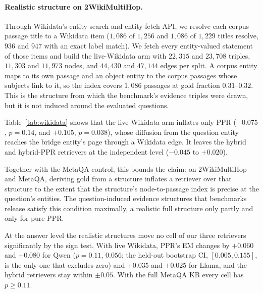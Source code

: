 \documentclass[11pt]{article}
\begin{document}
\paragraph{Realistic structure on 2WikiMultiHop.}\hfill\break Through Wikidata's entity-search and entity-fetch API, we resolve each corpus passage title to a Wikidata item ($1{,}086$ of $1{,}256$ and $1{,}086$ of $1{,}229$ titles resolve, $936$ and $947$ with an exact label match). We fetch every entity-valued statement of those items and build the live-Wikidata arm with $22{,}315$ and $23{,}708$ triples, $11{,}303$ and $11{,}973$ nodes, and $44{,}430$ and $47{,}144$ edges per split. A corpus entity maps to its own passage and an object entity to the corpus passages whose subjects link to it, so the index covers $1{,}086$ passages at gold fraction $0.31$--$0.32$. This is the structure from which the benchmark's evidence triples were drawn, but it is not induced around the evaluated questions.

Table~\ref{tab:wikidata} shows that the live-Wikidata arm inflates only PPR ($+0.075$, $p=0.14$, and $+0.105$, $p=0.038$), whose diffusion from the question entity reaches the bridge entity's page through a Wikidata edge. It leaves the hybrid and hybrid-PPR retrievers at the independent level ($-0.045$ to $+0.020$).

Together with the MetaQA control, this bounds the claim: on 2WikiMultiHop and MetaQA, deriving gold from a structure inflates a retriever over that structure to the extent that the structure's node-to-passage index is precise at the question's entities. The question-induced evidence structures that benchmarks release satisfy this condition maximally, a realistic full structure only partly and only for pure PPR.

At the answer level the realistic structures move no cell of our three retrievers significantly by the sign test. With live Wikidata, PPR's EM changes by $+0.060$ and $+0.080$ for Qwen ($p=0.11$, $0.056$; the held-out bootstrap CI, $[0.005,0.155]$, is the only one that excludes zero) and $+0.035$ and $+0.025$ for Llama, and the hybrid retrievers stay within $\pm0.05$. With the full MetaQA KB every cell has $p\geq0.11$.
\end{document}
